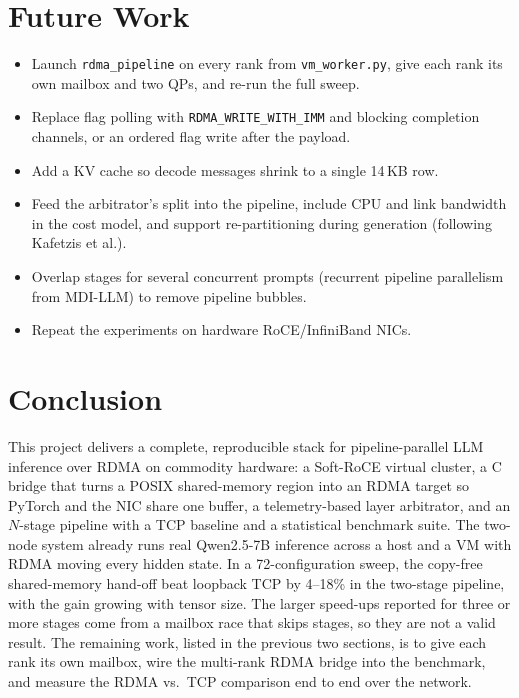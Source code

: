 \documentclass[11pt,a4paper]{article}
\begin{document}
\section{Future Work}
\begin{itemize}[leftmargin=*]
  \item Launch \texttt{rdma\_pipeline} on every rank from \texttt{vm\_worker.py}, give each rank its own mailbox and two QPs, and re-run the full sweep.
  \item Replace flag polling with \texttt{RDMA\_WRITE\_WITH\_IMM} and blocking completion channels, or an ordered flag write after the payload.
  \item Add a KV cache so decode messages shrink to a single 14\,KB row.
  \item Feed the arbitrator's split into the pipeline, include CPU and link bandwidth in the cost model, and support re-partitioning during generation (following Kafetzis et al.).
  \item Overlap stages for several concurrent prompts (recurrent pipeline parallelism from MDI-LLM) to remove pipeline bubbles.
  \item Repeat the experiments on hardware RoCE/InfiniBand NICs.
\end{itemize}

\section{Conclusion}
This project delivers a complete, reproducible stack for pipeline-parallel LLM inference over RDMA on commodity hardware: a Soft-RoCE virtual cluster, a C bridge that turns a POSIX shared-memory region into an RDMA target so PyTorch and the NIC share one buffer, a telemetry-based layer arbitrator, and an $N$-stage pipeline with a TCP baseline and a statistical benchmark suite. The two-node system already runs real Qwen2.5-7B inference across a host and a VM with RDMA moving every hidden state. In a 72-configuration sweep, the copy-free shared-memory hand-off beat loopback TCP by 4--18\% in the two-stage pipeline, with the gain growing with tensor size. The larger speed-ups reported for three or more stages come from a mailbox race that skips stages, so they are not a valid result. The remaining work, listed in the previous two sections, is to give each rank its own mailbox, wire the multi-rank RDMA bridge into the benchmark, and measure the RDMA vs.\ TCP comparison end to end over the network.
\end{document}
